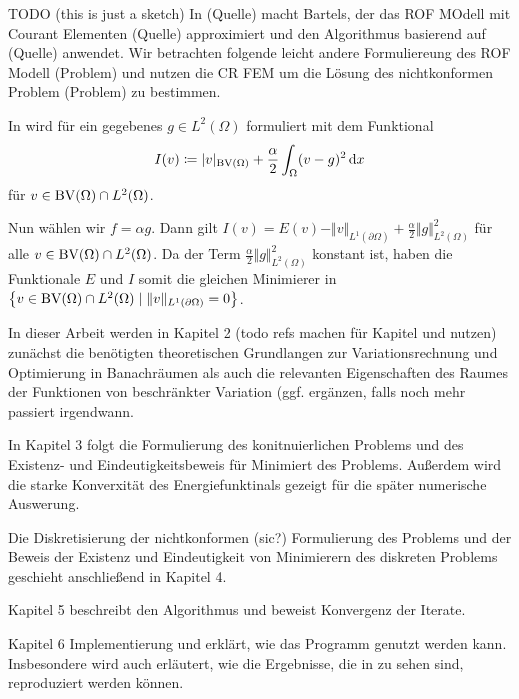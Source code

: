 \medskip
TODO (this is just a sketch)
In (Quelle) macht Bartels, der das ROF MOdell mit Courant Elementen (Quelle) 
approximiert und den Algorithmus basierend auf (Quelle) anwendet.
Wir betrachten folgende leicht andere Formuliereung des ROF Modell 
(Problem)
und nutzen die CR FEM um die Lösung des nichtkonformen Problem
(Problem) zu bestimmen.

\begin{remark}
  In \cite[Kapitel~10.1.3]{Bar15} wird  für ein
  gegebenes $g\in L^2(\Omega)$ formuliert
  mit dem Funktional 
  \begin{align*}
    I(v)\coloneqq |v|_{\textup{BV}(\Omega)} + \frac{\alpha}{2}\int_\Omega (v-g)^2\,\mathrm{d}x
  \end{align*}
  für $v\in \textup{BV}(\Omega)\cap L^2(\Omega)$.

  Nun wählen wir $f = \alpha g$. Dann gilt
  $I(v) = E(v) - \Vert v\Vert_{L^1(\partial \Omega)}+ 
  \frac{\alpha}{2}\Vert g\Vert_{L^2(\Omega)}^2$ für alle 
  $v\in \textup{BV}(\Omega)\cap L^2(\Omega)$. Da der Term $\frac{\alpha}{2}\Vert
  g\Vert_{L^2(\Omega)}^2$ konstant ist, haben die Funktionale $E$ und $I$ somit
  die gleichen Minimierer in $\left\{v\in\textup{BV}(\Omega)\cap L^2(\Omega)\mid 
  \Vert v\Vert_{L^1(\partial\Omega)}=0\right\}$.
\end{remark}

In dieser Arbeit werden in Kapitel 2 (todo refs machen für Kapitel und nutzen)
zunächst die benötigten theoretischen Grundlangen zur Variationsrechnung und
Optimierung in Banachräumen als auch die relevanten Eigenschaften des
Raumes der Funktionen von beschränkter Variation (ggf. ergänzen, falls noch
mehr passiert irgendwann.

In Kapitel 3 folgt die Formulierung des konitnuierlichen Problems und des
Existenz- und Eindeutigkeitsbeweis für Minimiert des Problems. Außerdem 
wird die starke Konverxität des Energiefunktinals gezeigt für die später
numerische Auswerung.

Die Diskretisierung der nichtkonformen (sic?) Formulierung  des Problems 
und der Beweis der Existenz und Eindeutigkeit von Minimierern des 
diskreten Problems geschieht anschließend in Kapitel 4.

Kapitel 5 beschreibt den Algorithmus und beweist Konvergenz der 
Iterate. 

Kapitel 6 Implementierung und erklärt, wie das Programm genutzt werden kann.
Insbesondere wird auch erläutert, wie die Ergebnisse, die in 
 zu sehen sind, reproduziert werden können.

